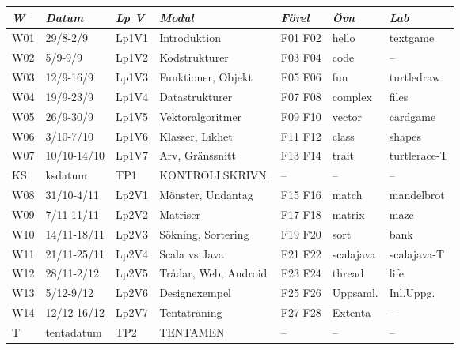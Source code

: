 \begin{tabular}{l|l|l|l|l|l|l}
\textit{W} & \textit{Datum} & \textit{Lp V} & \textit{Modul} & \textit{Förel} & \textit{Övn} & \textit{Lab} \\ \hline \hline
W01 & 29/8-2/9    & Lp1V1 & Introduktion         & F01 F02 & hello     & textgame     \\
W02 & 5/9-9/9     & Lp1V2 & Kodstrukturer        & F03 F04 & code      & --           \\
W03 & 12/9-16/9   & Lp1V3 & Funktioner, Objekt   & F05 F06 & fun       & turtledraw   \\
W04 & 19/9-23/9   & Lp1V4 & Datastrukturer       & F07 F08 & complex   & files        \\
W05 & 26/9-30/9   & Lp1V5 & Vektoralgoritmer     & F09 F10 & vector    & cardgame     \\
W06 & 3/10-7/10   & Lp1V6 & Klasser, Likhet      & F11 F12 & class     & shapes       \\
W07 & 10/10-14/10 & Lp1V7 & Arv, Gränssnitt      & F13 F14 & trait     & turtlerace-T \\
KS  & ksdatum     & TP1   & KONTROLLSKRIVN.      & --      & --        & --           \\
W08 & 31/10-4/11  & Lp2V1 & Mönster, Undantag    & F15 F16 & match     & mandelbrot   \\
W09 & 7/11-11/11  & Lp2V2 & Matriser             & F17 F18 & matrix    & maze         \\
W10 & 14/11-18/11 & Lp2V3 & Sökning, Sortering   & F19 F20 & sort      & bank         \\
W11 & 21/11-25/11 & Lp2V4 & Scala vs Java        & F21 F22 & scalajava & scalajava-T  \\
W12 & 28/11-2/12  & Lp2V5 & Trådar, Web, Android & F23 F24 & thread    & life         \\
W13 & 5/12-9/12   & Lp2V6 & Designexempel        & F25 F26 & Uppsaml.  & Inl.Uppg.    \\
W14 & 12/12-16/12 & Lp2V7 & Tentaträning         & F27 F28 & Extenta   & --           \\
T   & tentadatum  & TP2   & TENTAMEN             & --      & --        & --           \\
\end{tabular}
